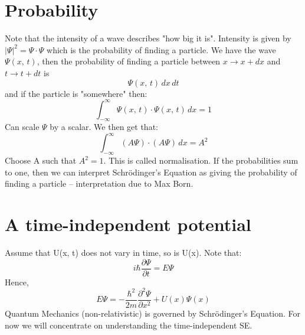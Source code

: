 \documentclass[a4paper, 11pt, normalem]{report}
\begin{document}
\section{Probability}
Note that the intensity of a wave describes "how big it is".
Intensity is given by $|\Psi|^{2} = \Psi\cdot\Psi$ which is the probability of finding a particle.
We have the wave $\Psi(x,\,t)$, then the probability of finding a particle between $x \rightarrow x + dx$ and $t \rightarrow t + dt$ is
\begin{equation}
    \Psi(x,\,t)\,dx\,dt
\end{equation}
and if the particle is "somewhere" then:
\begin{equation}
    \int_{-\infty}^{\infty} \Psi(x,\,t) \cdot \Psi(x,\,t)\,dx = 1
\end{equation}
Can scale $\Psi$ by a scalar.
We then get that:
\begin{equation}
    \int_{-\infty}^{\infty} (A\Psi) \cdot (A\Psi)\,dx = A^{2}
\end{equation}
Choose A such that $A^{2} = 1$.
This is called normalisation.
If the probabilities sum to one, then we can interpret Schr\"{o}dinger's Equation as giving the probability of finding a particle -- interpretation due to Max Born.

\section{A time-independent potential}
Assume that U(x, t) does not vary in time, so is U(x).
Note that:
\begin{equation}
    i\hbar\frac{\partial\Psi}{\partial t} = E\Psi
\end{equation}
Hence,
\begin{equation}
    E\Psi = -\frac{\hbar^{2}}{2m}\frac{\partial^{2} \Psi}{\partial x^{2}} + U(x)\Psi(x)
\end{equation}
Quantum Mechanics (non-relativistic) is governed by Schr\"{o}dinger's Equation.
For now we will concentrate on understanding the time-independent SE.
\end{document}
